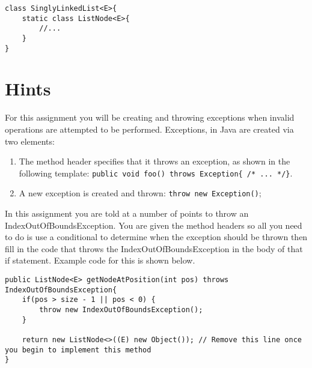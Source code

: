 \documentclass[a4paper]{article}
\begin{document}
\begin{lstlisting}[frame=trBL]
class SinglyLinkedList<E>{
    static class ListNode<E>{
        //...
    }
}
\end{lstlisting}


\newpage



\newpage
\section{Hints}

For this assignment you will be creating and throwing exceptions when invalid 
operations are attempted to be performed. Exceptions, in Java are created via
two elements:
\begin{enumerate}
	\item The method header specifies that it throws an exception, as shown in the following template: \lstinline|public void foo() throws Exception{ /* ... */}|.
	\item A new exception is created and thrown: \lstinline|throw new Exception()|;
\end{enumerate}
In this assignment you are told at a number of points to throw an  IndexOutOfBoundsException. You are given the 
method headers so all you need to do is use a conditional to determine when the exception should be thrown then
fill in the code that throws the IndexOutOfBoundsException in the body of that if statement. Example code for 
this is shown below.

\begin{lstlisting}[frame=trBL]
public ListNode<E> getNodeAtPosition(int pos) throws IndexOutOfBoundsException{
	if(pos > size - 1 || pos < 0) {
		throw new IndexOutOfBoundsException();
	}
	
	return new ListNode<>((E) new Object()); // Remove this line once you begin to implement this method
}
\end{lstlisting}
\end{document}
